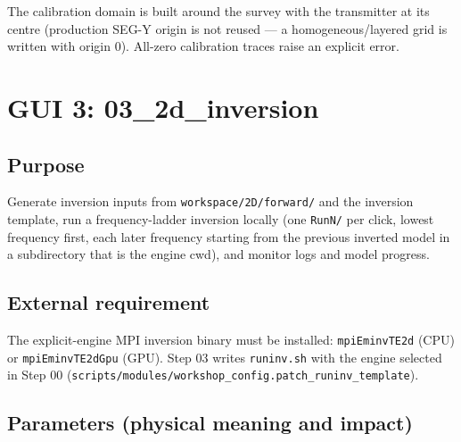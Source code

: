 \documentclass[11pt,a4paper]{article}
\begin{document}
\begin{itemize}
  The calibration domain is built around the survey with the transmitter at its centre (production SEG-Y origin is not reused — a homogeneous/layered grid is written with origin 0). All-zero calibration traces raise an explicit error.

\end{itemize}

\section{GUI 3: 03\_2d\_inversion}

\subsection{Purpose}

Generate inversion inputs from \texttt{workspace/2D/forward/} and the inversion template, run a frequency-ladder inversion locally (one \texttt{RunN/} per click, lowest frequency first, each later frequency starting from the previous inverted model in a subdirectory that is the engine cwd), and monitor logs and model progress.

\subsection{External requirement}

The explicit-engine MPI inversion binary must be installed: \texttt{mpiEminvTE2d} (CPU) or \texttt{mpiEminvTE2dGpu} (GPU). Step 03 writes \texttt{runinv.sh} with the engine selected in Step 00 (\texttt{scripts/modules/workshop\_config.patch\_runinv\_template}).

\subsection{Parameters (physical meaning and impact)}
\end{document}
